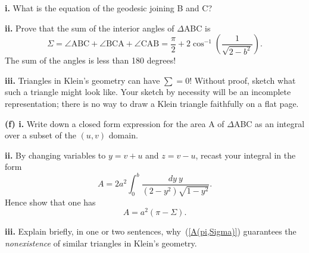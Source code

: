 \documentclass[a4paper]{article} %
\begin{document}
\begin{framed}
\textbf{i.} What is the equation of the geodesic joining B and C?
\end{framed}

\pagebreak %

\begin{framed}
\textbf{ii.} Prove that the sum of the interior angles of $\Delta$ABC is
\begin{equation}
\Sigma = \angle\text{ABC}+\angle\text{BCA}+\angle\text{CAB}=\frac{\pi}{2}+2\cos^{-1}\left(\frac{1}{\sqrt{2-b^2}}\right).
\end{equation}
The sum of the angles is less than 180 degrees!
\end{framed}

\pagebreak %

\begin{framed}
\textbf{iii.} Triangles in Klein’s geometry can have $\sum=0$! Without proof, sketch what such a triangle might look like. Your sketch by necessity will be an incomplete representation; there is no way to draw a Klein triangle faithfully on a flat page.
\end{framed}

\pagebreak %

\begin{framed}
\textbf{(f) i.} Write down a closed form expression for the area A of $\Delta$ABC as an integral over a subset of the $(u,v)$ domain.
\end{framed}

\pagebreak %

\begin{framed}
\textbf{ii.} By changing variables to $y=v+u$ and $z=v-u$, recast your integral in the form
\begin{equation}
A=2a^2\int^b_0 \frac{dy~y}{(2-y^2)\sqrt{1-y^2}}.
\end{equation}
Hence show that one has
\begin{equation}
A=a^2(\pi-\Sigma).\label{A(pi,Sigma)}
\end{equation}
\end{framed}

\pagebreak %

\begin{framed}
\textbf{iii.} Explain briefly, in one or two sentences, why~(\ref{A(pi,Sigma)}) guarantees the \emph{nonexistence} of similar triangles in Klein’s geometry.
\end{framed}
\end{document}
